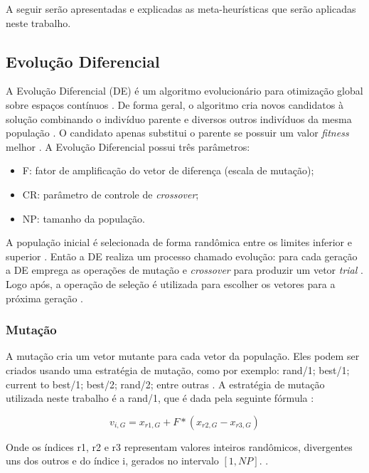 A seguir serão apresentadas e explicadas as meta-heurísticas que serão aplicadas neste trabalho.

\subsection{Evolução Diferencial}
\label{sub:de}

A Evolução Diferencial (DE) é um algoritmo evolucionário para otimização global sobre espaços contínuos \cite{brest}. De forma geral, o algoritmo cria novos candidatos à solução combinando o indivíduo parente e diversos outros indivíduos da mesma população \cite{brest}. O candidato apenas substitui o parente se possuir um valor \textit{fitness} melhor \cite{brest}. A Evolução Diferencial possui três parâmetros:

\begin{itemize}
    \item F: fator de amplificação do vetor de diferença (escala de mutação);
    \item CR: parâmetro de controle de \textit{crossover};
    \item NP: tamanho da população.
\end{itemize}

A população inicial é selecionada de forma randômica entre os limites inferior e superior \cite{brest}. Então a DE realiza um processo chamado evolução: para cada geração a DE emprega as operações de mutação e \textit{crossover} para produzir um vetor \textit{trial} \cite{brest}. Logo após, a operação de seleção é utilizada para escolher os vetores para a próxima geração \cite{brest}. 

\subsubsection{Mutação}

A mutação cria um vetor mutante para cada vetor da população. Eles podem ser criados usando uma estratégia de mutação, como por exemplo: rand/1; best/1; current to best/1; best/2; rand/2; entre outras \cite{brest}. A estratégia de mutação utilizada neste trabalho é a rand/1, que é dada pela seguinte fórmula \cite{brest}:

\begin{equation}
v_{i,G} =  x_{r1,G} + F * (x_{r2,G} - x_{r3,G}) 
\end{equation}

Onde os índices r1, r2 e r3 representam valores inteiros randômicos, divergentes uns dos outros e do índice i, gerados no intervalo $[1, NP]$. \cite{brest}.

